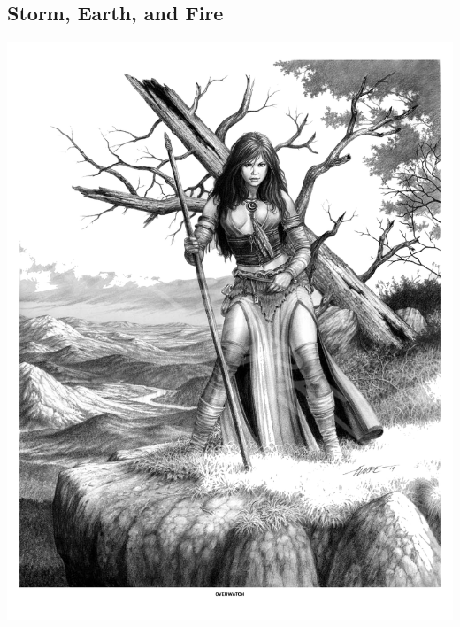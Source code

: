 \begin{multicols*}{2}

\subsection*{Storm, Earth, and Fire}

\begin{Figure}
\centering
\includegraphics[width=\textwidth]{img/druid-2.png}
\end{Figure}
    
\end{multicols*}


\clearpage

